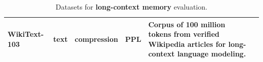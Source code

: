 \begin{table}[htbp]
{\begin{tabular}{
    >{\arraybackslash}m{3cm}
    >{\arraybackslash}m{2.5cm}
    >{\arraybackslash}m{2.5cm}
    >{\arraybackslash}m{3.1cm}
    >{\arraybackslash}m{6.5cm}
    >{\arraybackslash}m{1.3cm}
}
\textbf{WikiText-103} \newline \citep{merity2017pointer} & text & compression & PPL & Corpus of 100 million tokens from verified Wikipedia articles for long-context language modeling. & 2016 \\
\bottomrule
\end{tabular}
}
\caption{Datasets for \textbf{long-context memory} evaluation.}
\label{tab:longcontext_dataset}
\end{table}
